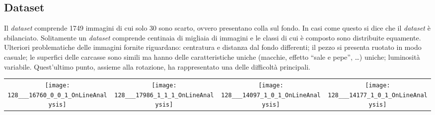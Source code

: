 \documentclass[a0,portrait]{a0poster}
\begin{document}
\begin{multicols}{2}
\section*{Dataset}
Il \textit{dataset} comprende 1749 immagini di cui solo 30 sono scarto, ovvero presentano colla sul fondo.
In casi come questo si dice che il \textit{dataset} è sbilanciato.
Solitamente un \textit{dataset} comprende centinaia di migliaia di immagini e le classi di cui è composto sono distribuite equamente.
Ulteriori problematiche delle immagini fornite riguardano:
centratura e distanza dal fondo differenti;
il pezzo si presenta ruotato in modo casuale;
le superfici delle carcasse sono simili ma hanno delle caratteristiche uniche (macchie, effetto ``sale e pepe'', \dots) uniche;
luminosità variabile.
Quest'ultimo punto, assieme alla rotazione, ha rappresentato una delle difficoltà principali.
\\
\begin{center}
    \begin{tabular}{cccc} \label{griglia_dataset}
      \texttt{[image: 128\_\_\_16760\_0\_0\_1\_OnLineAnalysis]} &
      \texttt{[image: 128\_\_\_17986\_1\_1\_1\_OnLineAnalysis]} &
      \texttt{[image: 128\_\_\_14097\_1\_0\_1\_OnLineAnalysis]} &
      \texttt{[image: 128\_\_\_14177\_1\_0\_1\_OnLineAnalysis]}
    \end{tabular}
\end{center}
  



\end{multicols}
\end{document}

